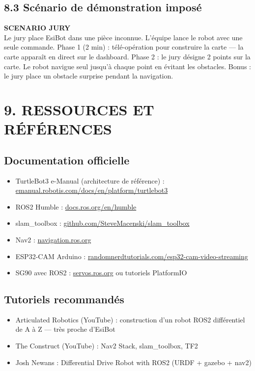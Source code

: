 \documentclass[12pt,a4paper]{article}
\begin{document}
\subsection{8.3 Scénario de démonstration imposé}

\begin{scenariobox}
\textbf{SCENARIO JURY}\\[4pt]
Le jury place EsiBot dans une pièce inconnue. L'équipe lance le robot avec une seule commande. Phase 1 (2 min) : télé-opération pour construire la carte — la carte apparaît en direct sur le dashboard. Phase 2 : le jury désigne 2 points sur la carte. Le robot navigue seul jusqu'à chaque point en évitant les obstacles. Bonus : le jury place un obstacle surprise pendant la navigation.
\end{scenariobox}

\section{9. RESSOURCES ET RÉFÉRENCES}

\subsection*{Documentation officielle}

\begin{itemize}
  \item TurtleBot3 e-Manual (architecture de référence) : \url{emanual.robotis.com/docs/en/platform/turtlebot3}
  \item ROS2 Humble : \url{docs.ros.org/en/humble}
  \item slam\_toolbox : \url{github.com/SteveMacenski/slam_toolbox}
  \item Nav2 : \url{navigation.ros.org}
  \item ESP32-CAM Arduino : \url{randomnerdtutorials.com/esp32-cam-video-streaming}
  \item SG90 avec ROS2 : \url{servos.ros.org} ou tutoriels PlatformIO
\end{itemize}

\subsection*{Tutoriels recommandés}

\begin{itemize}
  \item Articulated Robotics (YouTube) : construction d'un robot ROS2 différentiel de A à Z — très proche d'EsiBot
  \item The Construct (YouTube) : Nav2 Stack, slam\_toolbox, TF2
  \item Josh Newans : Differential Drive Robot with ROS2 (URDF + gazebo + nav2)
\end{itemize}
\end{document}
